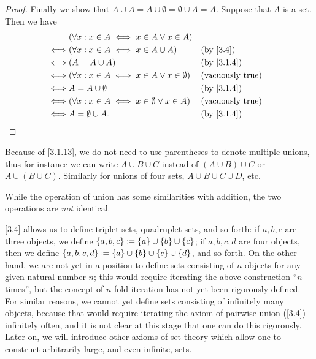 \begin{proof}
  Finally we show that \(A \cup A = A \cup \emptyset = \emptyset \cup A = A\).
  Suppose that \(A\) is a set.
  Then we have
  \begin{align*}
         & (\forall x : x \in A \iff x \in A \lor x \in A)                                      \\
    \iff & (\forall x : x \in A \iff x \in A \cup A)               &  & \by{3.4}                \\
    \iff & (A = A \cup A)                                          &  & \by{3.1.4}              \\
    \iff & (\forall x : x \in A \iff x \in A \lor x \in \emptyset) &  & \text{(vacuously true)} \\
    \iff & A = A \cup \emptyset                                    &  & \by{3.1.4}              \\
    \iff & (\forall x : x \in A \iff x \in \emptyset \lor x \in A) &  & \text{(vacuously true)} \\
    \iff & A = \emptyset \cup A.                                   &  & \by{3.1.4}
  \end{align*}
\end{proof}

\begin{note}
  Because of \cref{3.1.13}, we do not need to use parentheses to denote multiple unions, thus for instance we can write \(A \cup B \cup C\) instead of \((A \cup B) \cup C\) or \(A \cup (B \cup C)\).
  Similarly for unions of four sets, \(A \cup B \cup C \cup D\), etc.
\end{note}

\begin{rmk}\label{3.1.14}
  While the operation of union has some similarities with addition, the two operations are \emph{not} identical.
\end{rmk}

\begin{note}
  \cref{3.4} allows us to define triplet sets, quadruplet sets, and so forth: if \(a, b, c\) are three objects, we define \(\left\lbrace a, b, c\right\rbrace \coloneqq \left\lbrace a\right\rbrace \cup \left\lbrace b\right\rbrace \cup \left\lbrace c\right\rbrace\);
  if \(a, b, c, d\) are four objects, then we define \(\left\lbrace a, b, c, d\right\rbrace \coloneqq \left\lbrace a\right\rbrace \cup \left\lbrace b\right\rbrace \cup \left\lbrace c\right\rbrace \cup \left\lbrace d\right\rbrace\), and so forth.
  On the other hand, we are not yet in a position to define sets consisting of \(n\) objects for any given natural number \(n\);
  this would require iterating the above construction ``\(n\) times'', but the concept of \(n\)-fold iteration has not yet been rigorously defined.
  For similar reasons, we cannot yet define sets consisting of infinitely many objects, because that would require iterating the axiom of pairwise union (\cref{3.4}) infinitely often, and it is not clear at this stage that one can do this rigorously.
  Later on, we will introduce other axioms of set theory which allow one to construct arbitrarily large, and even infinite, sets.
\end{note}

